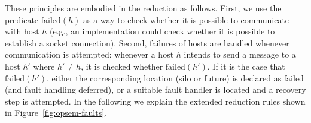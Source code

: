 \documentclass[preprint]{sigplanconf}
\theoremstyle{definition}
\theoremstyle{definition}
\begin{document}


These principles are embodied in the reduction as follows. First, we use the
predicate $\text{failed}(h)$ as a way to check whether it is possible to
communicate with host $h$ (e.g., an implementation could check whether it is
possible to establish a socket connection). Second, failures of hosts are
handled whenever communication is attempted: whenever a host $h$ intends to
send a message to a host $h'$ where $h' \neq h$, it is checked whether
$\text{failed}(h')$. If it is the case that $\text{failed}(h')$, either the
corresponding location (silo or future) is declared as failed (and fault
handling deferred), or a suitable fault handler is located and a recovery step
is attempted. In the following we explain the extended reduction rules shown
in Figure~\ref{fig:opsem-faults}.
\end{document}
